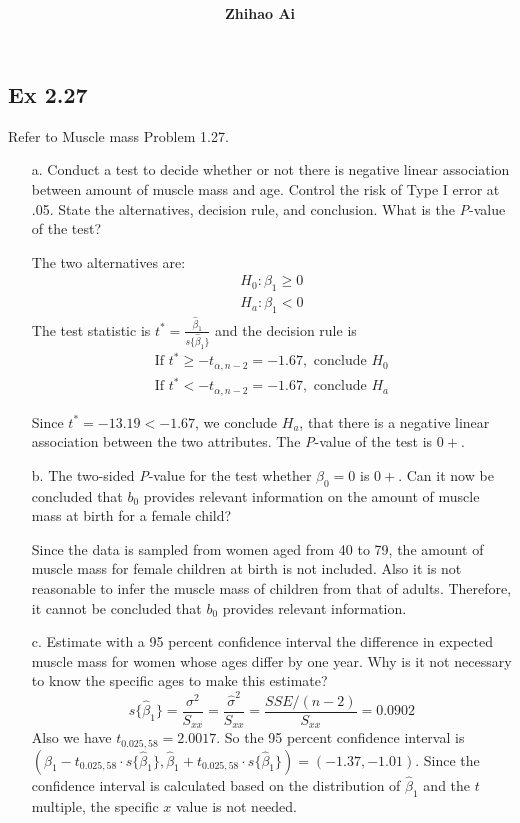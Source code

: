 \documentclass[10pt]{report}
\title{
	\vspace{2in}
	\textmd{\textbf{\hwCourse\\\hwTitle}}\\
	\vspace{0.3in}\large{\textit{\hmwkClassInstructor}}
	\vspace{3in}
}
\author{\textbf{Zhihao Ai}}
\date{}
\begin{document}
\maketitle

\subsection*{Ex 2.27}
Refer to Muscle mass Problem 1.27.
\begin{enumerate}
	\item [a.]
	Conduct a test to decide whether or not there is negative linear association between amount of muscle mass and age. Control the risk of Type I error at .05. State the alternatives, decision rule, and conclusion. What is the \textit{P}-value of the test?
	
	The two alternatives are:
	\begin{align*}
		H_0: \beta_1 \ge 0\\
		H_a: \beta_1 < 0
	\end{align*}
	The test statistic is $t^* = \frac{\hat{\beta}_1}{s\{\hat{\beta}_1\}}$ and the decision rule is
	\begin{align*}
		\text{If } t^* \ge -t_{\alpha, n-2} = -1.67, \text{ conclude } H_0\\
		\text{If } t^* < -t_{\alpha, n-2} = -1.67, \text{ conclude } H_a
	\end{align*}
	
	Since $t^* = -13.19 < -1.67$, we conclude $H_a$, that there is a negative linear association between the two attributes. The \textit{P}-value of the test is $0+$.
	
	\item [b.]
	The two-sided \textit{P}-value for the test whether $\beta_0 = 0$ is $0+$. Can it now be concluded that $b_0$ provides relevant information on the amount of muscle mass at birth for a female child?
	
	Since the data is sampled from women aged from 40 to 79, the amount of muscle mass for female children at birth is not included. Also it is not reasonable to infer the muscle mass of children from that of adults. Therefore, it cannot be concluded that $b_0$ provides relevant information.
	
	\item [c.]
	Estimate with a 95 percent confidence interval the difference in expected muscle mass for women whose ages differ by one year. Why is it not necessary to know the specific ages to make this estimate?
	\[
	s\{\hat{\beta}_1\} = \frac{\sigma^2}{S_{xx}} = \frac{\hat{\sigma}^2}{S_{xx}} = \frac{SSE/(n-2)}{S_{xx}} = 0.0902
	\]
	 Also we have $t_{0.025, 58} = 2.0017$. So the 95 percent confidence interval is $(\hat{\beta}_1 - t_{0.025, 58}\cdot s\{\hat{\beta}_1\}, \hat{\beta}_1 + t_{0.025, 58}\cdot s\{\hat{\beta}_1\}) = (-1.37, -1.01)$. Since the confidence interval is calculated based on the distribution of $\hat{\beta}_1$ and the $t$ multiple, the specific $x$ value is not needed.
\end{enumerate}
\end{document}
